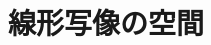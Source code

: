 \documentclass[../../../topic_linear-algebra]{subfiles}
\begin{document}
\sectionline
\section{線形写像の空間}

\todo{}
\end{document}
